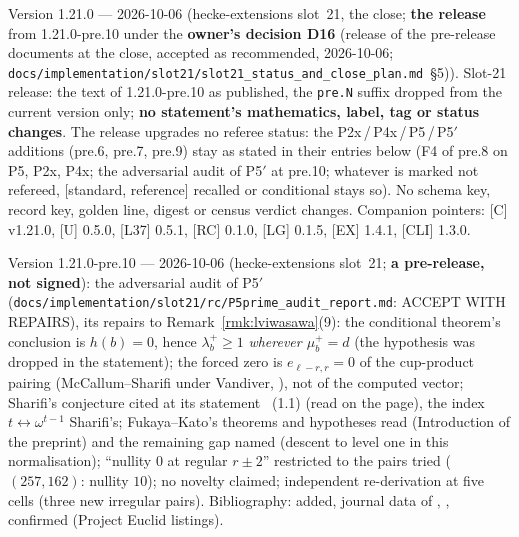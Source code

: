 \documentclass[11pt]{article}
\theoremstyle{remark}
\newcommand{\STD}{\textsf{[standard, reference]}}
\begin{document}
Version 1.21.0 --- 2026-10-06 (hecke-extensions slot~21, the close; \textbf{the release} from 1.21.0-pre.10 under the \textbf{owner's decision D16}
(release of the pre-release documents at the close, accepted as recommended, 2026-10-06; \texttt{docs/implementation/slot21/slot21\_status\_and\_close\_plan.md}~\S5)).
Slot-21 release: the text of 1.21.0-pre.10 as published, the \texttt{pre.N} suffix dropped from the current version only; \textbf{no statement's mathematics, label, tag or status changes}.
The release upgrades no referee status: the P2x\,/\,P4x\,/\,P5\,/\,P5$'$ additions (pre.6, pre.7, pre.9) stay as stated in their entries below (F4 of pre.8 on P5, P2x, P4x; the adversarial audit of P5$'$ at pre.10;
whatever is marked not refereed, \STD{} recalled or conditional stays so). No schema key, record key, golden line, digest or census verdict changes.
Companion pointers: [C] v1.21.0, [U] 0.5.0, [L37] 0.5.1, [RC] 0.1.0, [LG] 0.1.5, [EX] 1.4.1, [CLI] 1.3.0.

Version 1.21.0-pre.10 --- 2026-10-06 (hecke-extensions slot~21; \textbf{a pre-release, not signed}): the adversarial audit of P5$'$ (\texttt{docs/implementation/slot21/rc/P5prime\_audit\_report.md}: ACCEPT WITH REPAIRS),
its repairs to Remark~\ref{rmk:lviwasawa}(9): the conditional theorem's conclusion is $h(b)=0$, hence $\lambda^{+}_b\ge1$ \emph{wherever $\mu^{+}_b=d$} (the hypothesis was dropped in the statement); the forced zero is $e_{\ell-r,r}=0$ of the
cup-product pairing (McCallum--Sharifi under Vandiver, \cite{hho}), not of the computed vector; Sharifi's conjecture cited at its statement \cite{sharifi_reciprocity}~(1.1) (read on the page), the index $t\leftrightarrow\omega^{t-1}$ Sharifi's; Fukaya--Kato's
theorems and hypotheses read (Introduction of the preprint) and the remaining gap named (descent to level one in this normalisation); ``nullity $0$ at regular $r\pm2$'' restricted to the pairs tried ($(257,162)$: nullity $10$); no novelty claimed;
independent re-derivation at five cells (three new irregular pairs). Bibliography: \cite{sharifi_reciprocity} added, journal data of \cite{fukaya_kato}, \cite{mccallum_sharifi}, \cite{sharifi_eisenstein} confirmed (Project Euclid listings).
\end{document}
